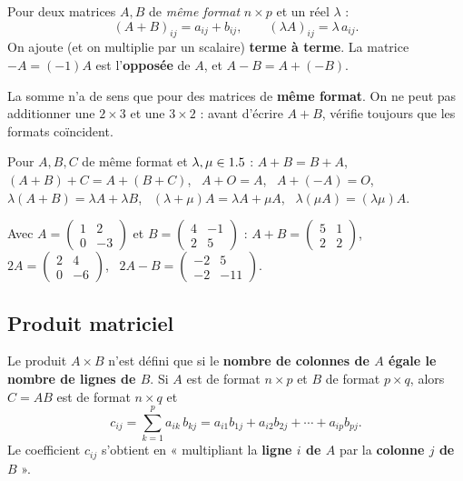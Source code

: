 \begin{definition}
Pour deux matrices $A,B$ de \emph{même format} $n\times p$ et un réel $\lambda$ :
\[
(A+B)_{ij}=a_{ij}+b_{ij},\qquad (\lambda A)_{ij}=\lambda\,a_{ij}.
\]
On ajoute (et on multiplie par un scalaire) \textbf{terme à terme}. La matrice $-A=(-1)A$ est
l'\textbf{opposée} de $A$, et $A-B=A+(-B)$.
\end{definition}

\begin{remarque}
La somme n'a de sens que pour des matrices de \textbf{même format}. On ne peut pas additionner une
$2\times3$ et une $3\times2$ : avant d'écrire $A+B$, vérifie toujours que les formats coïncident.
\end{remarque}

\begin{propriete}
Pour $A,B,C$ de même format et $\lambda,\mu\in1.5$ :
$A+B=B+A$, \ $(A+B)+C=A+(B+C)$, \ $A+O=A$, \ $A+(-A)=O$, \
$\lambda(A+B)=\lambda A+\lambda B$, \ $(\lambda+\mu)A=\lambda A+\mu A$, \ $\lambda(\mu A)=(\lambda\mu)A$.
\end{propriete}

\begin{exemple}
Avec $A=\begin{pmatrix}1&2\\0&-3\end{pmatrix}$ et $B=\begin{pmatrix}4&-1\\2&5\end{pmatrix}$ :
$A+B=\begin{pmatrix}5&1\\2&2\end{pmatrix}$, \ $2A=\begin{pmatrix}2&4\\0&-6\end{pmatrix}$, \
$2A-B=\begin{pmatrix}-2&5\\-2&-11\end{pmatrix}$.
\end{exemple}

\subsection{Produit matriciel}

\begin{definition}
Le produit $A\times B$ n'est défini que si le \textbf{nombre de colonnes de $A$ égale le
nombre de lignes de $B$}. Si $A$ est de format $n\times p$ et $B$ de format $p\times q$, alors
$C=AB$ est de format $n\times q$ et
\[
c_{ij}=\sum_{k=1}^{p}a_{ik}\,b_{kj}=a_{i1}b_{1j}+a_{i2}b_{2j}+\cdots+a_{ip}b_{pj}.
\]
Le coefficient $c_{ij}$ s'obtient en « multipliant la \textbf{ligne $i$ de $A$} par la
\textbf{colonne $j$ de $B$} ».
\end{definition}

